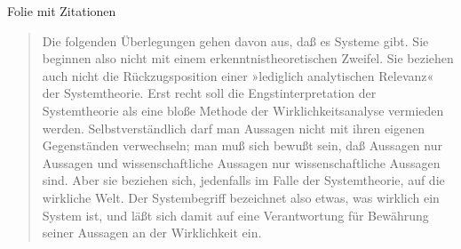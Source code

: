 \documentclass[aspectratio=169]{beamer} %
\begin{document}
\begin{frame}[fragile]{Folie mit Zitationen} 
\begin{quote}
	Die folgenden Überlegungen gehen davon aus, daß es Systeme gibt.
Sie beginnen also nicht mit einem erkenntnistheoretischen Zweifel.
Sie beziehen auch nicht die Rückzugsposition einer »lediglich analytischen Relevanz« der Systemtheorie. Erst recht soll die Engstinterpretation der Systemtheorie als eine bloße Methode der Wirklichkeitsanalyse vermieden werden. Selbstverständlich darf man
Aussagen nicht mit ihren eigenen Gegenständen verwechseln; man
muß sich bewußt sein, daß Aussagen nur Aussagen und wissenschaftliche Aussagen nur wissenschaftliche Aussagen sind. Aber sie
beziehen sich, jedenfalls im Falle der Systemtheorie, auf die wirkliche Welt. Der Systembegriff bezeichnet also etwas, was wirklich ein
System ist, und läßt sich damit auf eine Verantwortung für Bewährung seiner Aussagen an der Wirklichkeit ein.
\end{quote}




\end{frame}
\end{document}
